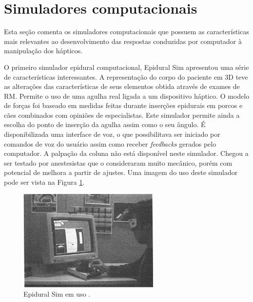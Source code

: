 \section {Simuladores computacionais}
\label{sec:simuladoresComputacionais}

Esta seção comenta os simuladores computacionais que possuem as características mais relevantes ao desenvolvimento das respostas conduzidas por computador à manipulação dos hápticos. 

O primeiro simulador epidural computacional, Epidural Sim \cite{Stredney1996} apresentou uma série de características interessantes. A representação do corpo do paciente em 3D teve as alterações das características de seus elementos obtida através de exames de \acrfull{RM}. Permite o uso de uma agulha real ligada a um dispositivo háptico. O modelo de forças foi baseado em medidas feitas durante inserções epidurais em porcos e cães combinados com opiniões de especialistas. Este simulador permite ainda a escolha do ponto de inserção da agulha assim como o seu ângulo. É disponibilizada uma interface de voz, o que possibilitava ser iniciado por comandos de voz do usuário assim como receber \textit{feedbacks} gerados pelo computador. A palpação da coluna não está disponível neste simulador. Chegou a ser testado por anestesistas que o consideraram muito mecânico, porém com potencial de melhora a partir de ajustes. Uma imagem do uso deste simulador pode ser vista na Figura \ref{fig:epiduralSim}. 

\begin{figure}[ht!]
    \centering
    \includegraphics[width=0.3\linewidth]{capitulos/figuras/epiduralSimulator.png} 
    \caption{Epidural Sim em uso \cite{Stredney1996}.}
    \label{fig:epiduralSim}
\end{figure}

